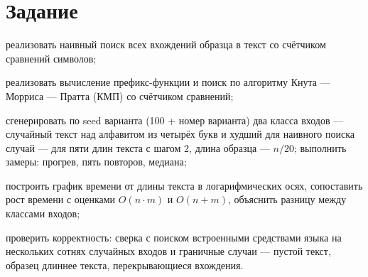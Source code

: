 \section{Задание}
\begin{bbttask}
  \item реализовать наивный поиск всех вхождений образца в текст со счётчиком сравнений
  символов;\label{task:naive}
  \item реализовать вычисление префикс-функции и поиск по алгоритму Кнута — Морриса — Пратта
  (КМП) со счётчиком сравнений;\label{task:kmp}
  \item сгенерировать по seed варианта (100 + номер варианта) два класса входов — случайный
  текст над алфавитом из четырёх букв и худший для наивного поиска случай — для пяти длин
  текста с шагом 2, длина образца — $n/20$; выполнить замеры: прогрев, пять повторов,
  медиана;\label{task:bench}
  \item построить график времени от длины текста в логарифмических осях, сопоставить рост
  времени с оценками $O(n \cdot m)$ и $O(n + m)$, объяснить разницу между классами
  входов;\label{task:analysis}
  \item проверить корректность: сверка с поиском встроенными средствами языка на нескольких
  сотнях случайных входов и граничные случаи — пустой текст, образец длиннее текста,
  перекрывающиеся вхождения.\label{task:check}
\end{bbttask}
